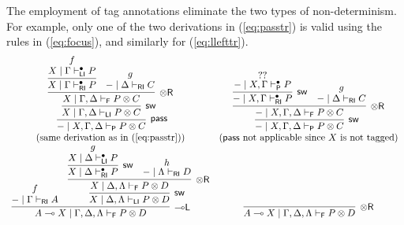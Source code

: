 \documentclass[submission,copyright,creativecommons]{eptcs}
\theoremstyle{definition}
\newcommand{\tr}{\otimes \mathsf{R}}
\newcommand{\lleft}{{\multimap}\mathsf{L}}
\newcommand{\pass}{\mathsf{pass}}
\newcommand{\ot}{\otimes}
\newcommand{\lolli}{\multimap}
\newcommand{\RI}{\mathsf{RI}}
\newcommand{\LI}{\mathsf{LI}}
\newcommand{\Pass}{\mathsf{P}}
\newcommand{\F}{\mathsf{F}}
\begin{document}
The employment of tag annotations eliminate the two types of non-determinism. For example, only one of the two derivations in (\ref{eq:passtr}) is valid using the rules in (\ref{eq:focus}), and similarly for (\ref{eq:llefttr}).
\vspace{-.3cm}
\begin{displaymath}
  \begin{array}{cc}
      \infer[\pass]{- \mid X , \Gamma , \Delta \vdash_{\Pass} P \ot C}{
        \infer[\mathsf{sw}]{X \mid \Gamma , \Delta \vdash_{\LI} P \ot C}{
          \infer[\tr]{X \mid \Gamma , \Delta \vdash_{\F} P \ot C}{
            \infer{X \mid \Gamma \vdash^{\bullet}_{\RI} P}{
              \deduce{X \mid \Gamma \vdash^{\bullet}_{\LI} P}{f}
              }
            &
            \deduce{- \mid \Delta \vdash_{\RI} C}{g}
          }
        }
      }
    &
    \infer[\mathsf{sw}]{- \mid X , \Gamma , \Delta \vdash_{\Pass} P \ot C}{
      \infer[\tr]{- \mid X , \Gamma , \Delta \vdash_{\F} P \ot C}{
        \infer[\mathsf{sw}]{- \mid X , \Gamma \vdash^{\bullet}_{\RI} P}{
          \deduce{- \mid X , \Gamma \vdash^{\bullet}_{\Pass} P}{??}
        }
        &
        \deduce{- \mid \Delta \vdash_{\RI} C}{g}
      }
    }
    \\
    (\text{same derivation as in (\ref{eq:passtr})})
    &
    (\text{$\pass$ not applicable since $X$ is not tagged})
    \\[2pt]
      \infer[\lleft]{A \lolli X \mid \Gamma , \Delta , \Lambda \vdash_{\F} P \ot D}{
        \deduce{- \mid \Gamma \vdash_{\RI} A}{f}
        &
        \infer[\mathsf{sw}]{X \mid \Delta , \Lambda \vdash_{\LI} P \ot D}{
          \infer[\tr]{X \mid \Delta , \Lambda \vdash_{\F} P \ot D}{
            \infer[\mathsf{sw}]{X \mid \Delta \vdash^{\bullet}_{\RI} P}{
              \deduce{X \mid \Delta \vdash^{\bullet}_{\LI} P}{g}
              }
            &
            \deduce{- \mid \Lambda \vdash_{\RI} D}{h}
          }
        }
      }
    &
      \infer[\tr]{A \lolli X \mid \Gamma , \Delta , \Lambda \vdash_{\F} P \ot D}{
}
\end{array}
\end{displaymath}
\end{document}

